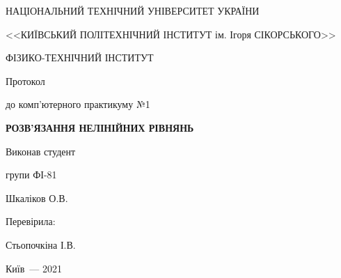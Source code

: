\thispagestyle{empty}

\begin{center}
НАЦІОНАЛЬНИЙ ТЕХНІЧНИЙ УНІВЕРСИТЕТ УКРАЇНИ \par
<<КИЇВСЬКИЙ ПОЛІТЕХНІЧНИЙ ІНСТИТУТ ім. Ігоря СІКОРСЬКОГО>>\par
ФІЗИКО-ТЕХНІЧНИЙ ІНСТИТУТ\par

\vspace{5cm}
{\huge Протокол \par до комп’ютерного практикуму №1 \par}

\vspace{1cm}
\huge\MakeUppercase{\textbf{ РОЗВ’ЯЗАННЯ
НЕЛІНІЙНИХ РІВНЯНЬ }} \par
\end{center}

\vspace{2cm}
\begin{flushright}
Виконав студент

групи ФІ-81

\bigbreak

Шкаліков О.В.

\vspace{20mm}
Перевірила:

Стьопочкіна І.В.

\end{flushright}

\vspace{5cm}
\begin{center}
{Київ~--- 2021}
\end{center}

\newpage
